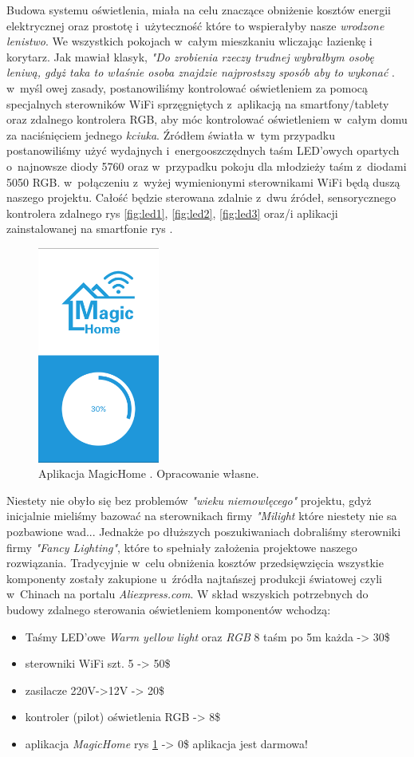 \documentclass{xmgr}
\begin{document}
	Budowa systemu oświetlenia, miała na celu znaczące obniżenie kosztów energii elektrycznej oraz prostotę i~użyteczność które to wspierałyby nasze \emph{wrodzone lenistwo}. We wszystkich pokojach w~całym mieszkaniu wliczając łazienkę i~ korytarz. Jak mawiał klasyk, \emph{"Do zrobienia rzeczy trudnej wybrałbym osobę leniwą, gdyż taka to właśnie osoba znajdzie najprostszy sposób aby to wykonać} \cite{gates}. w~myśl owej zasady, postanowiliśmy kontrolować oświetleniem za pomocą specjalnych sterowników WiFi sprzęgniętych z~aplikacją na smartfony/tablety oraz zdalnego kontrolera RGB, aby móc kontrolować oświetleniem w~całym domu za naciśnięciem jednego \emph{kciuka}. 
	Źródłem światła w~tym przypadku postanowiliśmy użyć wydajnych i~energooszczędnych taśm LED'owych opartych o~najnowsze diody 5760 oraz w~przypadku pokoju dla młodzieży taśm z~diodami 5050 RGB. w~połączeniu z~wyżej wymienionymi sterownikami WiFi będą duszą naszego projektu. Całość będzie sterowana zdalnie z~dwu źródeł, sensorycznego kontrolera zdalnego rys \ref{fig:led1}, \ref{fig:led2}, \ref{fig:led3} oraz/i aplikacji zainstalowanej na smartfonie rys . 
\begin{figure}[h]
\centering
\includegraphics[width=4cm]{magic}
\caption{Aplikacja MagicHome . Opracowanie własne.}
\label{fig:magic}
\end{figure}
	Niestety nie obyło się bez problemów \emph{"wieku niemowlęcego"} projektu, gdyż inicjalnie mieliśmy bazować na sterownikach firmy \emph{"Milight} które niestety nie sa pozbawione wad... Jednakże po dłuższych poszukiwaniach dobraliśmy sterowniki firmy \emph{"Fancy Lighting"}, które to spełniały założenia projektowe naszego rozwiązania. Tradycyjnie w~celu obniżenia kosztów przedsięwzięcia wszystkie komponenty zostały zakupione u~źródła najtańszej produkcji światowej czyli w~Chinach na portalu \emph{Aliexpress.com}.
	W skład wszyskich potrzebnych do budowy zdalnego sterowania oświetleniem komponentów wchodzą:
\begin{itemize}
	\item Taśmy LED'owe \emph{Warm yellow light} oraz \emph{RGB} 8 taśm po 5m każda -> 30\$
	\item sterowniki WiFi szt. 5 -> 50\$
	\item zasilacze 220V->12V -> 20\$ 
	\item kontroler (pilot) oświetlenia RGB -> 8\$
	\item aplikacja \emph{MagicHome} rys \ref{fig:magic} -> 0\$ aplikacja jest darmowa!
\end{itemize}
\end{document}

